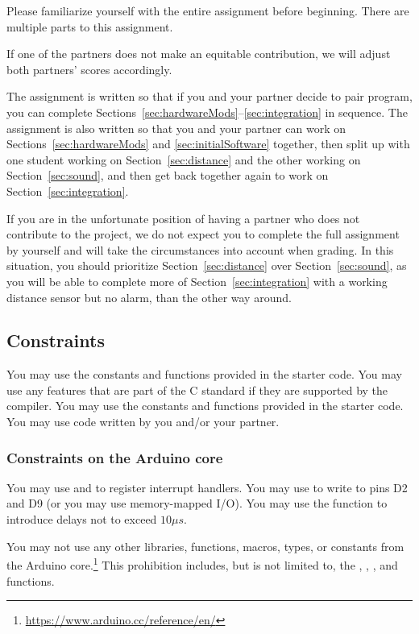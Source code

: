 Please familiarize yourself with the entire assignment before beginning.
There are multiple parts to this assignment.

If one of the partners does not make an equitable contribution, we will adjust both partners' scores accordingly.

The assignment is written so that if you and your partner decide to pair program, you can complete Sections~\ref{sec:hardwareMods}--\ref{sec:integration} in sequence.
The assignment is also written so that you and your partner can work on Sections~\ref{sec:hardwareMods} and \ref{sec:initialSoftware} together, then split up with one student working on Section~\ref{sec:distance} and the other working on Section~\ref{sec:sound}, and then get back together again to work on Section~\ref{sec:integration}.

If you are in the unfortunate position of having a partner who does not contribute to the project, we do not expect you to complete the full assignment by yourself and will take the circumstances into account when grading.
In this situation, you should prioritize Section~\ref{sec:distance} over Section~\ref{sec:sound}, as you will be able to complete more of Section~\ref{sec:integration} with a working distance sensor but no alarm, than the other way around.

\subsection{Constraints} \label{subsec:constraints}

You may use the constants and functions provided in the starter code.
You may use any features that are part of the C standard if they are supported by the compiler.
You may use the constants and functions provided in the starter code.
You may use code written by you and/or your partner.

\subsubsection{Constraints on the Arduino core}

You may use  and  to register interrupt handlers.
You may use  to write to pins D2 and D9 (or you may use memory-mapped I/O).
You may use the  function to introduce delays not to exceed $10\mu s$.

You may not use any other libraries, functions, macros, types, or constants from the Arduino core.\footnote{
    \url{https://www.arduino.cc/reference/en/}
}
This prohibition includes, but is not limited to, the , , , and  functions.

